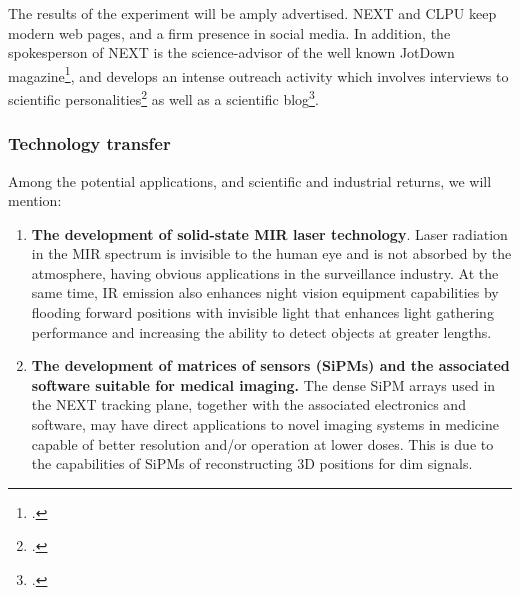 The results of the experiment will be amply advertised. NEXT and CLPU keep modern web pages, and a firm presence in social media. In addition, the spokesperson of NEXT is the science-advisor of the well known JotDown magazine\footcite{JotDown}, and develops an intense outreach activity which involves interviews to scientific personalities\footcite{JotDownNygrenBettini, JotDownCattaiGonzalez, JotDownHalzen} as well as a scientific blog\footcite{JotDownBlog}.

\subsubsection{Technology transfer}

Among the potential applications, and scientific and industrial returns, we will mention:
\begin{enumerate}
\item {\bf The development of solid-state MIR laser technology}. Laser radiation in the MIR spectrum is invisible to the human eye and is not absorbed by the atmosphere, having obvious applications in the surveillance industry. At the same time, IR emission also enhances night vision equipment capabilities by flooding forward positions with invisible light that enhances light gathering performance and increasing the ability to detect objects at greater lengths. 
\item {\bf The development of matrices of sensors (SiPMs) and the associated software suitable for medical imaging.} The dense SiPM arrays used in the NEXT tracking plane, together with the associated electronics and software, may have direct applications to novel imaging systems in medicine capable of better resolution and/or operation at lower doses. This is due to the capabilities of SiPMs of reconstructing 3D positions for dim signals. 
\end{enumerate}